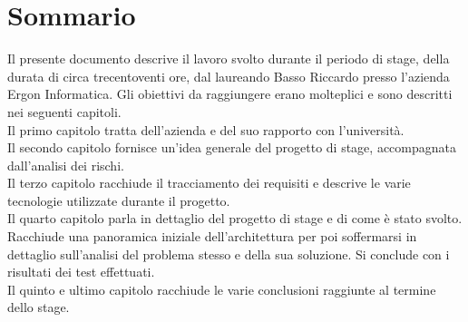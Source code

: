 
\cleardoublepage
{}
{}
\begingroup
\let\clearpage\relax
\let\cleardoublepage\relax
\let\cleardoublepage\relax

\chapter*{Sommario}

Il presente documento descrive il lavoro svolto durante il periodo di stage, della durata di circa trecentoventi ore, dal laureando Basso Riccardo presso l'azienda Ergon Informatica. 
Gli obiettivi da raggiungere erano molteplici e sono descritti nei seguenti capitoli.\\
Il primo capitolo tratta dell'azienda e del suo rapporto con l'università.\\
Il secondo capitolo fornisce un'idea generale del progetto di stage, accompagnata dall'analisi dei rischi.\\
Il terzo capitolo racchiude il tracciamento dei requisiti e descrive le varie tecnologie utilizzate durante il progetto.\\
Il quarto capitolo parla in dettaglio del progetto di stage e di come è stato svolto. Racchiude una panoramica iniziale dell'architettura per poi soffermarsi in dettaglio
sull'analisi del problema stesso e della sua soluzione. Si conclude con i risultati dei test effettuati.\\
Il quinto e ultimo capitolo racchiude le varie conclusioni raggiunte al termine dello stage.\\


%
%

\endgroup			

\vfill

